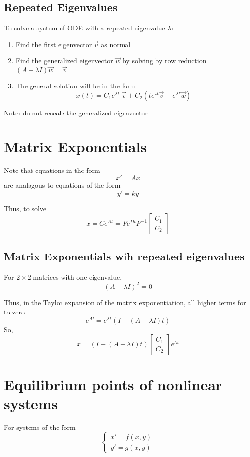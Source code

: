 \documentclass[12pt]{article}
\begin{document}
\subsection*{Repeated Eigenvalues}
To solve a system of ODE with a repeated eigenvalue $\lambda$:
\begin{enumerate}
    \item Find the first eigenvector $\vec{v}$ as normal
    \item Find the generalized eigenvector $\vec{w}$ by solving by row reduction $(A - \lambda I) \vec{w} = \vec{v}$
    \item The general solution will be in the form
    \[\boxed{x(t) = C_1e^{\lambda t} \; \vec{v} + C_2 (te^{\lambda t} \vec{v} + e^{\lambda t} \vec{w})}\]
\end{enumerate}

Note: do not rescale the generalized eigenvector

\section{Matrix Exponentials}
Note that equations in the form 
\[x' = Ax\]
are analagous to equations of the form 
\[y' = ky\]

Thus, to solve
\[\boxed{x = Ce^{At} = Pe^{Dt}P^{-1} \begin{bmatrix}
    C_1\\
    C_2
\end{bmatrix}}\]

\subsection*{Matrix Exponentials wih repeated eigenvalues}
For $2 \times 2$ matrices with one eigenvalue,
\[(A - \lambda I)^2 = 0\]

Thus, in the Taylor expansion of the matrix exponentiation, all higher terms for to zero.
\[e^{At} = e^{\lambda t}(I + (A - \lambda I)t)\]
So,
\[\boxed{x = (I + (A - \lambda I)t) \begin{bmatrix}
    C_1\\C_2
\end{bmatrix}e^{\lambda t} }\]

\section{Equilibrium points of nonlinear systems}
For systems of the form 
\[\begin{cases}
    x' = f(x, y)\\
    y' = g(x, y)
\end{cases}\]
\end{document}

